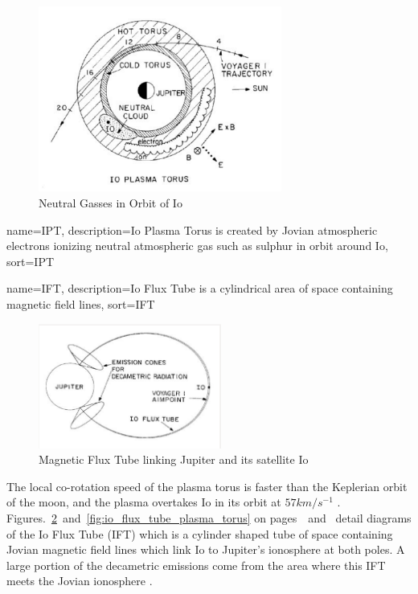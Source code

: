 %
\begin{figure}[here]
\centering
\includegraphics[width=8cm]{images/02}
\caption{Neutral Gasses in Orbit of Io \citep{belcher87}}
\label{fig:io_neutral_gasses}
\end{figure}
%

%
{
  name={IPT},
  description={Io Plasma Torus is created by Jovian atmospheric electrons ionizing neutral atmospheric gas such as sulphur in orbit around Io},
  sort=IPT
}
%

%
{
  name={IFT},
  description={Io Flux Tube is a cylindrical area of space containing magnetic field lines},
  sort=IFT
}
%

%
\begin{figure}[here]
\centering
\includegraphics[width=6cm]{images/03}
\caption{Magnetic Flux Tube linking Jupiter and its satellite Io \citep{belcher87}}
\label{fig:io_flux_tube}
\end{figure}
%

The local co-rotation speed of the plasma torus is faster than the Keplerian orbit of the moon, and the plasma overtakes Io in its orbit at \begin{math} 57 km/s^{-1} \end{math} \citep{belcher87}. Figures.~\ref{fig:io_flux_tube}~and~\ref{fig:io_flux_tube_plasma_torus} on pages~\pageref{fig:io_flux_tube}~and~\pageref{fig:io_flux_tube_plasma_torus} detail diagrams of the Io Flux Tube (\gls{IFT}) which is a cylinder shaped tube of space containing Jovian magnetic field lines \citep{belcher87} which link Io to Jupiter's ionosphere at both poles. A large portion of the decametric emissions come from the area where this \gls{IFT} meets the Jovian ionosphere \citep{belcher87}. 

